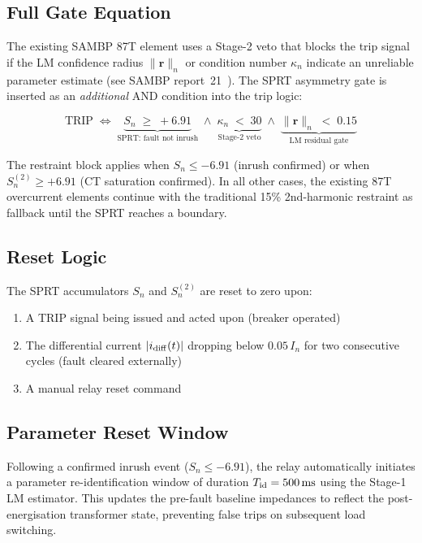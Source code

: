 \documentclass[11pt, a4paper]{article}
\newcommand{\ms}{\,\text{ms}}
\begin{document}
\subsection{Full Gate Equation}

The existing SAMBP 87T element uses a Stage-2 veto that blocks the trip
signal if the LM confidence radius $\|\mathbf{r}\|_n$ or condition number
$\kappa_n$ indicate an unreliable parameter estimate (see SAMBP
report~21~\cite{SAMBP_TR21}).  The SPRT asymmetry gate is inserted as an
\emph{additional} AND condition into the trip logic:

\begin{equation}
  \boxed{
    \text{TRIP} \;\Longleftrightarrow\;
    \underbrace{S_n \;\geq\; +6.91}_{\text{SPRT: fault not inrush}}
    \;\wedge\;
    \underbrace{\kappa_n \;<\; 30}_{\text{Stage-2 veto}}
    \;\wedge\;
    \underbrace{\|\mathbf{r}\|_n \;<\; 0.15}_{\text{LM residual gate}}
  }
  \label{eq:gate}
\end{equation}

The restraint block applies when $S_n \leq -6.91$ (inrush confirmed) or
when $S_n^{(2)} \geq +6.91$ (CT saturation confirmed).  In all other cases,
the existing 87T overcurrent elements continue with the traditional 15\%
2nd-harmonic restraint as fallback until the SPRT reaches a boundary.

\subsection{Reset Logic}

The SPRT accumulators $S_n$ and $S_n^{(2)}$ are reset to zero upon:
\begin{enumerate}
  \item A TRIP signal being issued and acted upon (breaker operated)
  \item The differential current $|i_{\rm diff}(t)|$ dropping below $0.05\,I_n$
    for two consecutive cycles (fault cleared externally)
  \item A manual relay reset command
\end{enumerate}

\subsection{Parameter Reset Window}

Following a confirmed inrush event ($S_n \leq -6.91$), the relay automatically
initiates a parameter re-identification window of duration $T_{\rm id} = 500\ms$
using the Stage-1 LM estimator.  This updates the pre-fault baseline impedances
to reflect the post-energisation transformer state, preventing false trips on
subsequent load switching.
\end{document}
